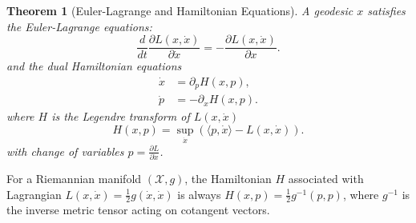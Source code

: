\documentclass{amsart}
\newtheorem{theorem}{Theorem}[section]
\theoremstyle{definition}
\theoremstyle{remark}
\numberwithin{equation}{section}
\begin{document}
\begin{theorem}[Euler-Lagrange and Hamiltonian Equations]
A geodesic $x$ satisfies the Euler-Lagrange equations:
\begin{equation}
    \frac{d}{dt}\frac{\partial L(x, \dot{x})}{\partial \dot{x}} = - \frac{\partial L(x,\dot{x})}{\partial x}.
\end{equation}
and the dual Hamiltonian equations
\begin{align}
    \dot{x} &= \partial_p H(x,p), \\
    \dot{p} &= -\partial_x H(x,p).
\end{align}
where $H$ is the Legendre transform of $L(x, \dot{x})$
\begin{equation}
    H(x, p) = \sup_{\dot{x}} (\langle p, \dot{x} \rangle - L(x, \dot{x})).
\end{equation}
with change of variables $p = \frac{\partial L}{\partial \dot{x}}$.
\end{theorem}
For a Riemannian manifold $(\mathcal{X}, g)$, the Hamiltonian $H$ associated with Lagrangian $L(x,\dot{x}) = \frac{1}{2}g(\dot{x}, \dot{x})$ is always $H(x, p) = \frac{1}{2} g^{-1}(p, p)$, where $g^{-1}$ is the inverse metric tensor acting on cotangent vectors.
\end{document}
